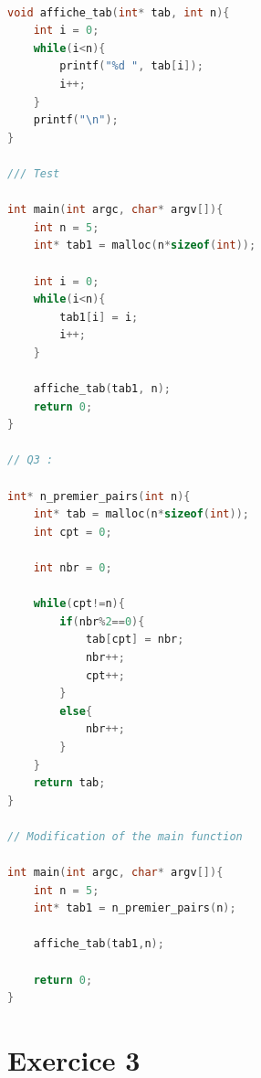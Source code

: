 \documentclass{article}
\begin{document}
\begin{lstlisting}[language=C, caption={Array Exercice}]
    
void affiche_tab(int* tab, int n){
    int i = 0; 
    while(i<n){
        printf("%d ", tab[i]); 
        i++; 
    }
    printf("\n");
}

/// Test 

int main(int argc, char* argv[]){
    int n = 5; 
    int* tab1 = malloc(n*sizeof(int)); 

    int i = 0; 
    while(i<n){
        tab1[i] = i; 
        i++; 
    }

    affiche_tab(tab1, n); 
    return 0; 
}

// Q3 :

int* n_premier_pairs(int n){ 
    int* tab = malloc(n*sizeof(int)); 
    int cpt = 0;

    int nbr = 0; 

    while(cpt!=n){
        if(nbr%2==0){
            tab[cpt] = nbr; 
            nbr++; 
            cpt++; 
        }
        else{
            nbr++; 
        }
    }
    return tab; 
}

// Modification of the main function 

int main(int argc, char* argv[]){
    int n = 5; 
    int* tab1 = n_premier_pairs(n); 
    
    affiche_tab(tab1,n); 

    return 0; 
}
\end{lstlisting}

\section*{\textbf{Exercice 3}}
\end{document}
